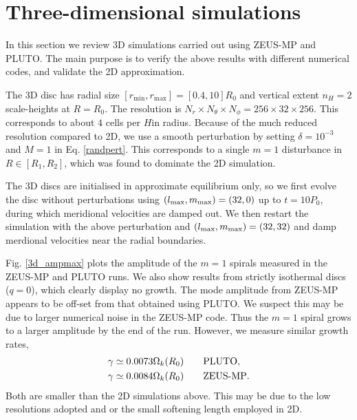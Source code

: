 \section{Three-dimensional simulations}\label{results3d}
In this section we review 3D simulations carried 
out using ZEUS-MP and PLUTO. The main purpose is to verify 
the above results with different numerical codes, and validate  
the 2D approximation.    

The 3D disc has radial size
$[r_\mathrm{min},r_\mathrm{max}]=[0.4,10]R_0$ and vertical extent  
$n_H=2$ scale-heights at $R=R_0$. The resolution is $N_r\times N_\theta\times
N_\phi=256\times32\times256$. This corresponds to about $4$ cells per
$H$in radius. Because of the much reduced resolution 
compared to 2D, we use a smooth perturbation by setting
$\delta = 10^{-3}$ and $M=1$ in Eq. \ref{randpert}. This corresponds
to a single $m=1$ disturbance in $R\in[R_1,R_2]$, which was found to dominate
the 2D simulation.  

The 3D discs are initialised in approximate equilibrium only, so we
first evolve the disc without perturbations using  
$(l_\mathrm{max},m_\mathrm{max})=(32,0)$ up to $t=10P_0$, during which 
meridional velocities are damped out. We then restart the simulation
with the above perturbation and $(l_\mathrm{max},m_\mathrm{max})=(32,32)$ and damp
merdional velocities near the radial boundaries. 

Fig. \ref{3d_ampmax} plots the amplitude of the $m=1$ spirals measured
in the ZEUS-MP and PLUTO runs. We also show results from strictly
isothermal discs ($q=0$), which clearly display no growth. %
The mode amplitude from ZEUS-MP appears to be off-set from that obtained using
PLUTO. We suspect this may be due to larger numerical noise in the
ZEUS-MP code. Thus the $m=1$ spiral grows to a larger amplitude by the
end of the run. However, we measure similar growth rates,
\begin{align*}
  &\gamma \simeq 0.0073\Omega_k(R_0) \quad\quad \mathrm{PLUTO},\\
  &\gamma \simeq 0.0084\Omega_k(R_0) \quad\quad {\operatorname{ZEUS-MP}}.
\end{align*}
Both are smaller than the 2D simulations above. This may be due to the
low resolutions adopted and or the small softening length employed in
2D.  

